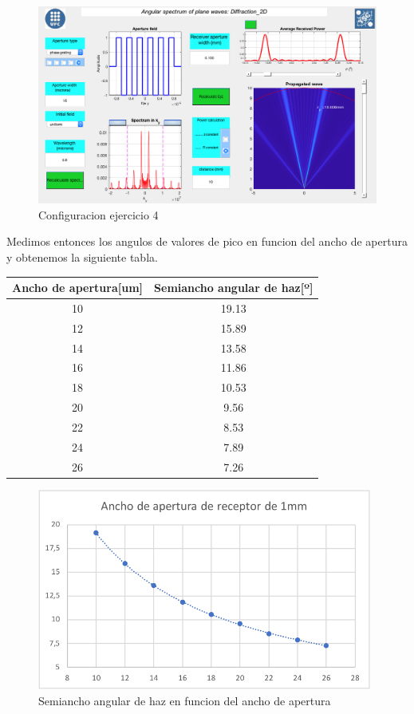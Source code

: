 \documentclass[12pt, a4papre]{article}
\begin{document}
	\begin{figure}[H]
		\begin{center}
		\includegraphics[width=150mm]{programa1.png}
		\caption{Configuracion ejercicio 4}
		\end{center}
	\end{figure}
	
	Medimos entonces los angulos de valores de pico en funcion del ancho de apertura y obtenemos la siguiente tabla.
	\begin{center}
		\begin{tabular}{ ||c|c|| } 
			\hline
			Ancho de apertura[um]& Semiancho angular de haz[º]\\ 
			\hline
			10 & 19.13\\ 
			12 & 15.89\\ 
			14 & 13.58\\ 
			16 & 11.86\\ 
			18 & 10.53\\ 
			20 & 9.56\\ 
			22 & 8.53\\ 
			24 & 7.89\\ 
			26 & 7.26\\ 
			\hline
		\end{tabular}
	\end{center}
	\begin{figure}[H]
		\begin{center}
		\includegraphics[width=110mm]{graph3.png}
		\caption{Semiancho angular de haz en funcion del ancho de apertura}
		\end{center}
	\end{figure}
	
\end{document}
